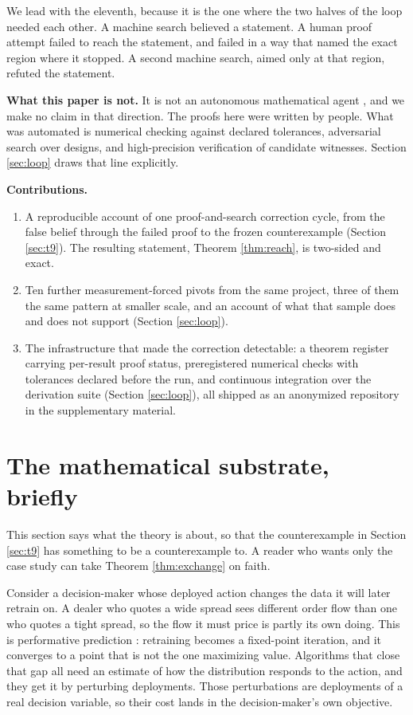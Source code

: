 \documentclass{article}
\begin{document}
We lead with the eleventh, because it is the one where the two halves of the
loop needed each other. A machine search believed a statement. A human proof
attempt failed to reach the statement, and failed in a way that named the
exact region where it stopped. A second machine search, aimed only at that
region, refuted the statement.

\textbf{What this paper is not.} It is not an autonomous mathematical agent
\citep{hubert2025olympiad}, and we make no claim in that direction. The proofs
here were written by people. What was automated is numerical checking against declared tolerances,
adversarial search over designs, and high-precision verification of candidate
witnesses. Section \ref{sec:loop} draws that line explicitly.

\textbf{Contributions.}
\begin{enumerate}\itemsep1pt
\item A reproducible account of one proof-and-search correction cycle, from
the false belief through the failed proof to the frozen counterexample
(Section \ref{sec:t9}). The resulting statement, Theorem \ref{thm:reach}, is
two-sided and exact.
\item Ten further measurement-forced pivots from the same project, three of
them the same pattern at smaller scale, and an account of what that sample
does and does not support (Section \ref{sec:loop}).
\item The infrastructure that made the correction detectable: a theorem
register carrying per-result proof status, preregistered numerical checks
with tolerances declared before the run, and continuous integration over the
derivation suite (Section \ref{sec:loop}), all shipped as an anonymized
repository in the supplementary material.
\end{enumerate}

\section{The mathematical substrate, briefly}
\label{sec:substrate}

This section says what the theory is about, so that the counterexample in
Section \ref{sec:t9} has something to be a counterexample to. A reader who
wants only the case study can take Theorem \ref{thm:exchange} on faith.

Consider a decision-maker whose deployed action changes the data it will
later retrain on. A dealer who quotes a wide spread sees different order flow
than one who quotes a tight spread, so the flow it must price is partly its
own doing. This is performative prediction
\citep{perdomo2020performative,hardt2023performative}: retraining becomes a
fixed-point iteration, and it converges to a point that is not the one
maximizing value. Algorithms that close that gap
\citep{izzo2021learn,miller2021outside,drusvyatskiy2022stochastic} all need an estimate of how the distribution responds to the action, and they
get it by perturbing deployments. Those perturbations are deployments of a real
decision variable, so their cost lands in the decision-maker's own objective.
\end{document}
